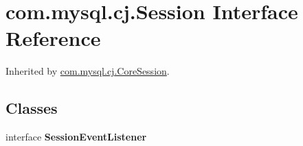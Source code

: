 \hypertarget{interfacecom_1_1mysql_1_1cj_1_1_session}{}\section{com.\+mysql.\+cj.\+Session Interface Reference}
\label{interfacecom_1_1mysql_1_1cj_1_1_session}


Inherited by \mbox{\hyperlink{classcom_1_1mysql_1_1cj_1_1_core_session}{com.\+mysql.\+cj.\+Core\+Session}}.

\subsection*{Classes}
\begin{DoxyCompactItemize}
\item 
interface {\bfseries Session\+Event\+Listener}
\end{DoxyCompactItemize}
